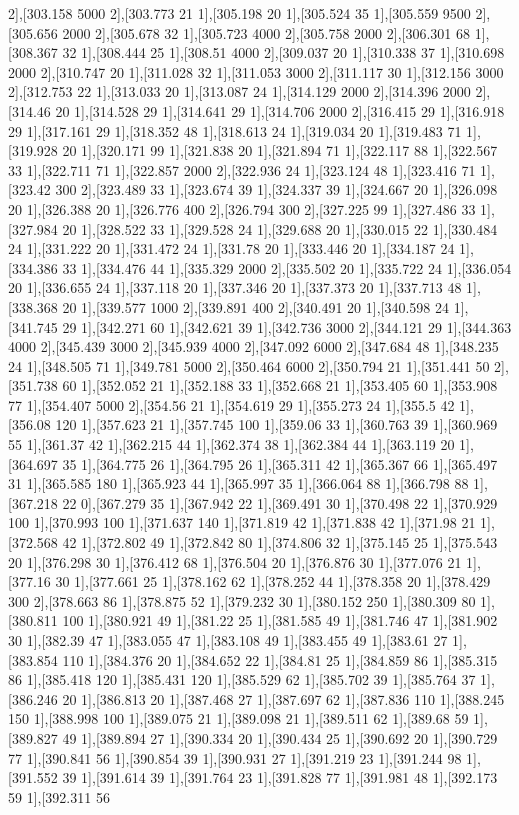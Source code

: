 {2],[303.158 5000 2],[303.773 21 1],[305.198 20 1],[305.524 35 1],[305.559 9500 2],[305.656 2000 2],[305.678 32 1],[305.723 4000 2],[305.758 2000 2],[306.301 68 1],[308.367 32 1],[308.444 25 1],[308.51 4000 2],[309.037 20 1],[310.338 37 1],[310.698 2000 2],[310.747 20 1],[311.028 32 1],[311.053 3000 2],[311.117 30 1],[312.156 3000 2],[312.753 22 1],[313.033 20 1],[313.087 24 1],[314.129 2000 2],[314.396 2000 2],[314.46 20 1],[314.528 29 1],[314.641 29 1],[314.706 2000 2],[316.415 29 1],[316.918 29 1],[317.161 29 1],[318.352 48 1],[318.613 24 1],[319.034 20 1],[319.483 71 1],[319.928 20 1],[320.171 99 1],[321.838 20 1],[321.894 71 1],[322.117 88 1],[322.567 33 1],[322.711 71 1],[322.857 2000 2],[322.936 24 1],[323.124 48 1],[323.416 71 1],[323.42 300 2],[323.489 33 1],[323.674 39 1],[324.337 39 1],[324.667 20 1],[326.098 20 1],[326.388 20 1],[326.776 400 2],[326.794 300 2],[327.225 99 1],[327.486 33 1],[327.984 20 1],[328.522 33 1],[329.528 24 1],[329.688 20 1],[330.015 22 1],[330.484 24 1],[331.222 20 1],[331.472 24 1],[331.78 20 1],[333.446 20 1],[334.187 24 1],[334.386 33 1],[334.476 44 1],[335.329 2000 2],[335.502 20 1],[335.722 24 1],[336.054 20 1],[336.655 24 1],[337.118 20 1],[337.346 20 1],[337.373 20 1],[337.713 48 1],[338.368 20 1],[339.577 1000 2],[339.891 400 2],[340.491 20 1],[340.598 24 1],[341.745 29 1],[342.271 60 1],[342.621 39 1],[342.736 3000 2],[344.121 29 1],[344.363 4000 2],[345.439 3000 2],[345.939 4000 2],[347.092 6000 2],[347.684 48 1],[348.235 24 1],[348.505 71 1],[349.781 5000 2],[350.464 6000 2],[350.794 21 1],[351.441 50 2],[351.738 60 1],[352.052 21 1],[352.188 33 1],[352.668 21 1],[353.405 60 1],[353.908 77 1],[354.407 5000 2],[354.56 21 1],[354.619 29 1],[355.273 24 1],[355.5 42 1],[356.08 120 1],[357.623 21 1],[357.745 100 1],[359.06 33 1],[360.763 39 1],[360.969 55 1],[361.37 42 1],[362.215 44 1],[362.374 38 1],[362.384 44 1],[363.119 20 1],[364.697 35 1],[364.775 26 1],[364.795 26 1],[365.311 42 1],[365.367 66 1],[365.497 31 1],[365.585 180 1],[365.923 44 1],[365.997 35 1],[366.064 88 1],[366.798 88 1],[367.218 22 0],[367.279 35 1],[367.942 22 1],[369.491 30 1],[370.498 22 1],[370.929 100 1],[370.993 100 1],[371.637 140 1],[371.819 42 1],[371.838 42 1],[371.98 21 1],[372.568 42 1],[372.802 49 1],[372.842 80 1],[374.806 32 1],[375.145 25 1],[375.543 20 1],[376.298 30 1],[376.412 68 1],[376.504 20 1],[376.876 30 1],[377.076 21 1],[377.16 30 1],[377.661 25 1],[378.162 62 1],[378.252 44 1],[378.358 20 1],[378.429 300 2],[378.663 86 1],[378.875 52 1],[379.232 30 1],[380.152 250 1],[380.309 80 1],[380.811 100 1],[380.921 49 1],[381.22 25 1],[381.585 49 1],[381.746 47 1],[381.902 30 1],[382.39 47 1],[383.055 47 1],[383.108 49 1],[383.455 49 1],[383.61 27 1],[383.854 110 1],[384.376 20 1],[384.652 22 1],[384.81 25 1],[384.859 86 1],[385.315 86 1],[385.418 120 1],[385.431 120 1],[385.529 62 1],[385.702 39 1],[385.764 37 1],[386.246 20 1],[386.813 20 1],[387.468 27 1],[387.697 62 1],[387.836 110 1],[388.245 150 1],[388.998 100 1],[389.075 21 1],[389.098 21 1],[389.511 62 1],[389.68 59 1],[389.827 49 1],[389.894 27 1],[390.334 20 1],[390.434 25 1],[390.692 20 1],[390.729 77 1],[390.841 56 1],[390.854 39 1],[390.931 27 1],[391.219 23 1],[391.244 98 1],[391.552 39 1],[391.614 39 1],[391.764 23 1],[391.828 77 1],[391.981 48 1],[392.173 59 1],[392.311 56 }
